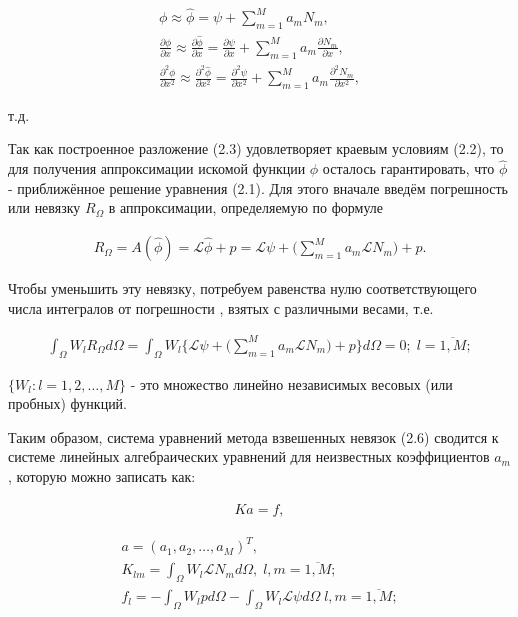 \documentclass[14pt]{extreport}
\begin{document}
\begin{gather}
\phi \approx \hat\phi = \psi + \sum\limits_{m=1}^{M} a_mN_m,\nonumber\\
\frac{\partial \phi}{\partial x} \approx \frac{\partial \hat\phi}{\partial x}=\frac{\partial \psi}{\partial x}+\sum\limits_{m=1}^{M} a_m\frac{\partial N_m}{\partial x},\nonumber\\
\frac{\partial^2 \phi}{\partial x^2} \approx \frac{\partial^2 \hat\phi}{\partial x^2}=\frac{\partial^2 \psi}{\partial x^2}+\sum\limits_{m=1}^{M} a_m\frac{\partial^2 N_m}{\partial x^2}, \nonumber
\end{gather}

 т.д.

Так как построенное разложение (2.3) удовлетворяет краевым условиям (2.2), то для получения аппроксимации искомой функции $\phi$ осталось гарантировать, что $\hat\phi$ - приближённое решение уравнения (2.1). Для этого вначале введём погрешность или невязку $R_\Omega$ в аппроксимации, определяемую по формуле


\begin{eqnarray}
R_\Omega=A(\hat\phi)=\mathcal L \hat\phi+p=\mathcal L\psi+\bigg(\sum\limits_{m=1}^{M} a_m \mathcal L N_m\bigg) +p.
\end{eqnarray}

Чтобы уменьшить эту невязку, потребуем равенства нулю соответствующего числа интегралов от погрешности \cite{Zorich:2002:CALC}, взятых с различными весами, т.е.

\begin{eqnarray}
\int_\Omega W_l R_\Omega d\Omega = \int_\Omega W_l \bigg\{\mathcal L \psi +\bigg(\sum\limits_{m=1}^{M} a_m \mathcal L N_m\bigg) +p \bigg\} d\Omega =0; \; l=\overline{1,M};
\end{eqnarray}

 $\{W_l:l=1,2,\dots,M\}$ - это множество линейно независимых весовых (или пробных) функций.

Таким образом, система уравнений метода взвешенных невязок (2.6) сводится к системе линейных алгебраических уравнений для неизвестных коэффициентов $a_m$, которую можно записать как:

\begin{eqnarray}
Ka=f,
\end{eqnarray}


\begin{gather}
a = (a_1,a_2,\dots, a_M)^T, \\
K_{lm}=\int_\Omega W_l \mathcal L N_m  d\Omega, \; l,m=\overline{1,M}; \\
f_l=-\int_\Omega W_l p d \Omega-\int_\Omega W_l \mathcal L \psi d \Omega \; l,m=\overline{1,M};
\end{gather}
\end{document}
